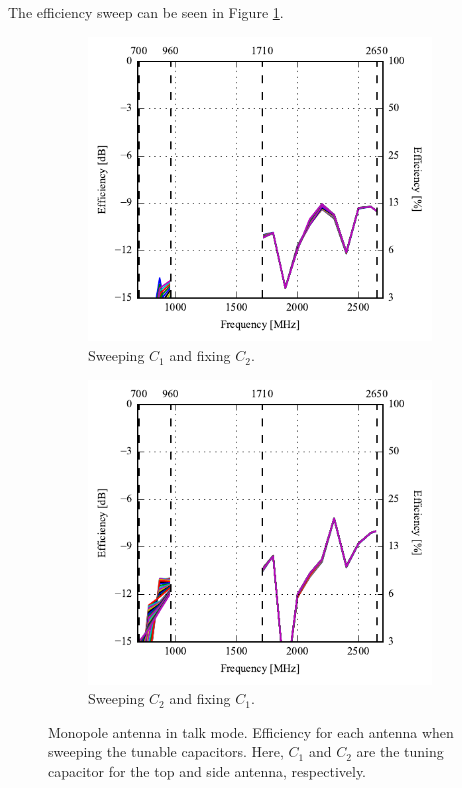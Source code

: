 The efficiency sweep can be seen in Figure \ref{fig:eff_mono_modi_talk_mode}. 
\begin{figure}[htbp]
    \centering
    \begin{subfigure}{0.49\linewidth}
        \includegraphics{img/tech_sol/monopole/highband/ue/talkmode/eff_top.pdf}
        \caption{Sweeping $C_1$ and fixing $C_2$.}
    \end{subfigure}
    \hfill
    \begin{subfigure}{0.49\linewidth}
        \includegraphics{img/tech_sol/monopole/highband/ue/talkmode/eff_side.pdf}
        \caption{Sweeping $C_2$ and fixing $C_1$.}
    \end{subfigure}
    \caption{Monopole antenna in talk mode. Efficiency for each antenna when sweeping the tunable capacitors. Here, $C_1$ and $C_2$ are the tuning capacitor for the top and side antenna, respectively. }
    \label{fig:eff_mono_modi_talk_mode}
\end{figure}

